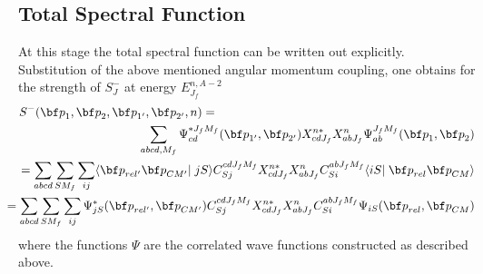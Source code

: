 \subsection{Total Spectral Function}
At this stage 
the total spectral function can be written out explicitly. Substitution
of the above mentioned angular momentum coupling, one obtains for the
strength of $S^-_J$ at energy $E^{n,A-2}_{J_f}$ 
%
	\begin{eqnarray}
	\lefteqn{
		S^-( \rvec{p}_1, \rvec{p}_2, \rvec{p}_{1'}, \rvec{p}_{2'}, n )
	=}
	\label{eq:CRSF} \\
	&&
		\sum_{abcd,M_f}
		\Psi^{\ast J_f M_f}_{cd}( \rvec{p}_{1'}, \rvec{p}_{2'} )
		X^{n\ast}_{cd J_f}
		X^{n}_{ab J_f}
		\Psi^{ J_f M_f}_{ab}( \rvec{p}_1, \rvec{p}_2 )
	\nonumber \\
	&&
	\!\!\!\!
	\!\!\!\!
	\!\!\!\!
	=
		\sum_{abcd}
		\sum_{SM_f}
		\sum_{ij}
		\inp< \rvec{p}_{rel'} \rvec{p}_{\CM'} | j S >
		C^{ cd J_f M_f }_{Sj}
		X^{n\ast}_{cd J_f}
		X^{n}_{ab J_f}
		C^{ ab J_f M_f }_{Si}
		\inp< i S | \rvec{p}_{rel} \rvec{p}_{\CM} >
	\nonumber \\
	&&
	\!\!\!\!
	\!\!\!\!
	\!\!\!\!
	=
		\sum_{abcd}
		\sum_{SM_f}
		\sum_{ij}
		\Psi^\ast_{jS}( \rvec{p}_{rel'},\rvec{p}_{\CM'})
		C^{ cd J_f M_f }_{Sj}
		X^{n\ast}_{cd J_f}
		X^{n}_{ab J_f}
		C^{ ab J_f M_f }_{Si}
		\Psi_{i S}( \rvec{p}_{rel}, \rvec{p}_{\CM} )
	\nonumber
	\end{eqnarray}
%
where the functions $\Psi$ are the correlated wave functions constructed
as described above.
